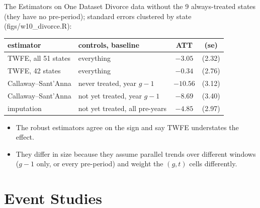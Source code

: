 \documentclass[aspectratio=169,11pt,xcolor=dvipsnames]{beamer}
\newcommand{\srcp}[1]{{\scriptsize\color{gray}(#1)}}
\begin{document}
\begin{frame}{The Estimators on One Dataset}
Divorce data without the 9 always-treated states (they have no pre-period);
standard errors clustered by state \srcp{figs/w10\_divorce.R}:
\vskip3pt
\begin{center}\small
\renewcommand{\arraystretch}{1.1}
\begin{tabular}{@{}llcc@{}}
\toprule
estimator & controls, baseline & ATT & (se) \\
\midrule
TWFE, all 51 states & everything & $-3.05$ & (2.32) \\
TWFE, 42 states & everything & $-0.34$ & (2.76) \\
Callaway--Sant'Anna & never treated, year $g-1$ & $-10.56$ & (3.12) \\
Callaway--Sant'Anna & not yet treated, year $g-1$ & $-8.69$ & (3.40) \\
imputation & not yet treated, all pre-years & $-4.85$ & (2.97) \\
\bottomrule
\end{tabular}
\end{center}
\vskip3pt
\begin{itemize}\itemsep2pt
  \item The robust estimators agree on the sign and say TWFE understates the effect.
  \item They differ in size because they assume parallel trends over different
        windows ($g-1$ only, or every pre-period) and weight the $(g,t)$ cells
        differently.
\end{itemize}
\end{frame}

\section[Event Studies]{Event Studies}
\begin{frame}\sectionpage\end{frame}
\end{document}
